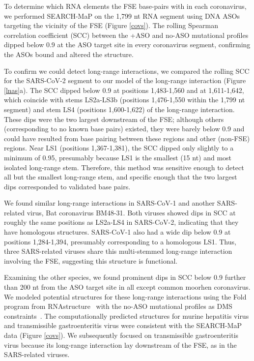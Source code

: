 \documentclass[main.tex]{subfiles}
\begin{document}
To determine which RNA elements the FSE base-pairs with in each coronavirus, we performed SEARCH-MaP on the 1,799 nt RNA segment using DNA ASOs targeting the vicinity of the FSE (Figure \ref{covs}).
The rolling Spearman correlation coefficient (SCC) between the +ASO and no-ASO mutational profiles dipped below 0.9 at the ASO target site in every coronavirus segment, confirming the ASOs bound and altered the structure.

To confirm we could detect long-range interactions, we compared the rolling SCC for the SARS-CoV-2 segment to our model of the long-range interaction (Figure \ref{lnas}a).
The SCC dipped below 0.9 at positions 1,483-1,560 and at 1,611-1,642, which coincide with stems LS2a-LS3b (positions 1,476-1,550 within the 1,799 nt segment) and stem LS4 (positions 1,600-1,622) of the long-range interaction.
These dips were the two largest downstream of the FSE; although others (corresponding to no known base pairs) existed, they were barely below 0.9 and could have resulted from base pairing between these regions and other (non-FSE) regions.
Near LS1 (positions 1,367-1,381), the SCC dipped only slightly to a minimum of 0.95, presumably because LS1 is the smallest (15 nt) and most isolated long-range stem.
Therefore, this method was sensitive enough to detect all but the smallest long-range stem, and specific enough that the two largest dips corresponded to validated base pairs.

We found similar long-range interactions in SARS-CoV-1 and another SARS-related virus, Bat coronavirus BM48-31.
Both viruses showed dips in SCC at roughly the same positions as LS2a-LS4 in SARS-CoV-2, indicating that they have homologous structures.
SARS-CoV-1 also had a wide dip below 0.9 at positions 1,284-1,394, presumably corresponding to a homologous LS1.
Thus, three SARS-related viruses share this multi-stemmed long-range interaction involving the FSE, suggesting this structure is functional.

Examining the other species, we found prominent dips in SCC below 0.9 further than 200 nt from the ASO target site in all except common moorhen coronavirus.
We modeled potential structures for these long-range interactions using the Fold program from RNAstructure~\cite{Mathews2004a} with the no-ASO mutational profiles as DMS constraints~\cite{Cordero2012}.
The computationally predicted structures for murine hepatitis virus and transmissible gastroenteritis virus were consistent with the SEARCH-MaP data (Figure \ref{covs}).
We subsequently focused on transmissible gastroenteritis virus because its long-range interaction lay downstream of the FSE, as in the SARS-related viruses.
\end{document}
